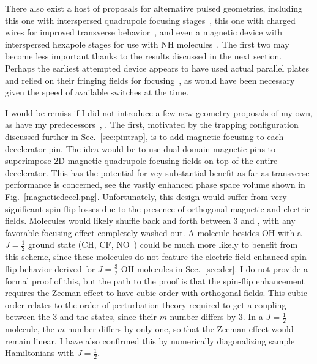 There also exist a host of proposals for alternative pulsed geometries, including this one with interspersed quadrupole focusing stages~\cite{Sawyer2008a}, this one with charged wires for improved transverse behavior~\cite{Wang2016}, and even a magnetic device with interspersed hexapole stages for use with NH molecules~\cite{Plomp2019}. The first two may become less important thanks to the results discussed in the next section. Perhaps the earliest attempted device appears to have used actual parallel plates and relied on their fringing fields for focusing~\cite{Golub1967}, as would have been necessary given the speed of available switches at the time.

I would be remiss if I did not introduce a few new geometry proposals of my own, as have my predecessors~\citep[Sec.~5.5]{SawyerThesis2010}, \citep[Sec.~7.3]{HudsonThesis2006}.
The first, motivated by the trapping configuration discussed further in Sec.~\ref{sec:pintrap}, is to add magnetic focusing to each decelerator pin.
The idea would be to use dual domain magnetic pins to superimpose 2D magnetic quadrupole focusing fields on top of the entire decelerator.
This has the potential for vey substantial benefit as far as transverse performance is concerned, see the vastly enhanced phase space volume shown in Fig.~\ref{magneticdecel.png}.
Unfortunately, this design would suffer from very significant spin flip losses due to the presence of orthogonal magnetic and electric fields.
Molecules would likely shuffle back and forth between \f3 and , with any favorable focusing effect completely washed out.
A molecule besides OH with a $J=\frac{1}{2}$ ground state (CH, CF, NO~\cite{VanDeMeerakker2006thesis, weibel1998hexapole}) could be much more likely to benefit from this scheme, since these molecules do not feature the electric field enhanced spin-flip behavior derived for $J=\frac{3}{2}$ OH molecules in Sec.~\ref{sec:der}.
I do not provide a formal proof of this, but the path to the proof is that the spin-flip enhancement requires the Zeeman effect to have cubic order with orthogonal fields.
This cubic order relates to the order of perturbation theory required to get a coupling between the \f3 and the  states, since their $m$ number differs by $3$. 
In a $J=\frac{1}{2}$ molecule, the $m$ number differs by only one, so that the Zeeman effect would remain linear.
I have also confirmed this by numerically diagonalizing sample Hamiltonians with $J=\frac{1}{2}$.


